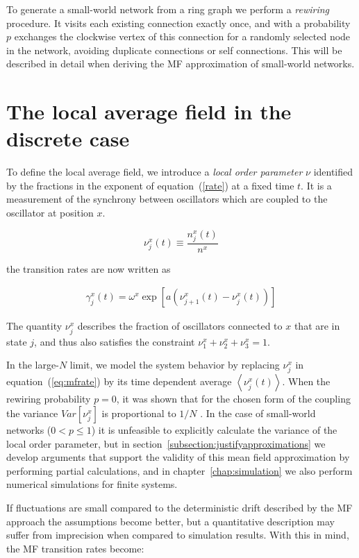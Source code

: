 To generate a small-world network from a ring graph we perform a \textit{rewiring} procedure. It visits each existing connection
exactly once, and with a probability $p$ exchanges the clockwise vertex of this connection for a randomly selected node in the network,
avoiding duplicate connections or self connections. This will be described in detail when deriving the MF approximation of small-world
networks.

\section{The local average field in the discrete case}

To define the local average field, we introduce a \textit{local order parameter} $\nu$ identified by the fractions in the exponent of
equation~(\ref{rate}) at a fixed time $t$. It is a measurement of the synchrony between oscillators which are coupled to the oscillator
at position $x$.

\begin{equation}
  \nu^x_j(t) \equiv \frac{n^x_j(t)}{n^x}
\end{equation}

\noindent the transition rates are now written as

\begin{align}
  \gamma^x_j(t) = \omega^x\exp\left[ a(\nu^x_{j+1}(t) - \nu^x_j(t)) \right]
  \label{eq:mfrate}
\end{align}

The quantity $\nu^x_j$ describes the fraction of oscillators connected to $x$ that are in state $j$, and thus also satisfies the
constraint $\nu^x_1+\nu^x_2+\nu^x_3=1$.

In the large-$N$ limit, we model the system behavior by replacing $\nu^x_j$ in equation~(\ref{eq:mfrate}) by its time dependent average
$\left< \nu^x_j(t) \right>$. When the rewiring probability $p=0$, it was shown that for the chosen form of the coupling the variance
$Var[\nu^x_j]$ is proportional to $1/N$ \cite{escaff2014arrays}. In the case of small-world networks ($0<p \leq 1$) it is unfeasible to
explicitly calculate the variance of the local order parameter, but in section~\ref{subsection:justifyapproximations} we develop
arguments that support the validity of this mean field approximation by performing partial calculations, and in
chapter~\ref{chap:simulation} we also perform numerical simulations for finite systems.

If fluctuations are small compared to the deterministic drift described by the MF approach the assumptions become better, but a
quantitative description may suffer from imprecision when compared to simulation results. With this in mind, the MF transition rates
become:

